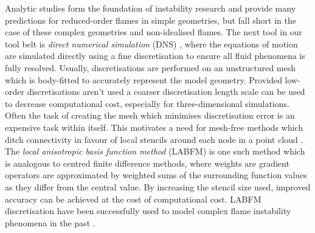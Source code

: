 Analytic studies form the foundation of instability research and provide many predictions for reduced-order flames in simple geometries, but fall short in the case of these complex geometries and non-idealised flames. The next tool in our tool belt is \emph{direct numerical simulation} (DNS) \cite{orszag1970AnalyticalTheoriesTurbulence}, where the equations of motion are simulated directly using a fine discretisation to ensure all fluid phenomena is fully resolved. Usually, discretisations are performed on an unstructured mesh which is body-fitted to accurately represent the model geometry. Provided low-order discretisations aren't used a coarser discretisation length scale can be used to decrease computational cost, especially for three-dimensional simulations. Often the task of creating the mesh which minimises discretisation error is an expensive task within itself. This motivates a need for mesh-free methods which ditch connectivity in favour of local stencils around each node in a point cloud \cite{garg2018MeshfreeMethodsComprehensive, li2002MeshfreeParticleMethods}. The \emph{local anisotropic basis function method} (LABFM) \cite{king2020HighOrderDifference, king2022HighOrderSimulationsIsothermal} is one such method which is analogous to centred finite difference methods, where weights are gradient operators are approximated by weighted sums of the surrounding function values as they differ from the central value. By increasing the stencil size used, improved accuracy can be achieved at the cost of computational cost. LABFM discretisation have been successfully used to model complex flame instability phenomena in the past \cite{king2024MeshFreeFrameworkHighOrdera, broadley2025HighorderMeshfreeDirect}.

